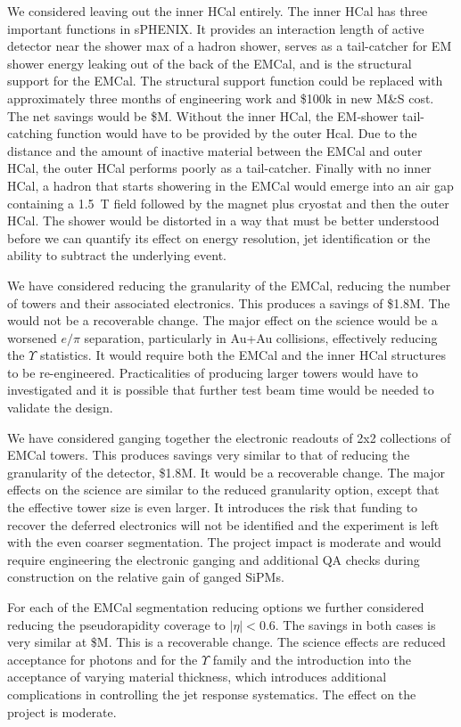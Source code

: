 We considered leaving out the inner HCal entirely.  The inner HCal has
three important functions in sPHENIX.  It provides an interaction
length of active detector near the shower max of a hadron shower,
serves as a tail-catcher for EM shower energy leaking out of the back
of the EMCal, and is the structural support for the EMCal.  The
structural support function could be replaced with approximately three
months of engineering work and \$100k in new M\&S cost.  The net
savings would be \${\noInnerHCal}M.  Without the inner HCal, the
EM-shower tail-catching function would have to be provided by the
outer Hcal.  Due to the distance and the amount of inactive material
between the EMCal and outer HCal, the outer HCal performs poorly as a
tail-catcher.  Finally with no inner HCal, a hadron that starts
showering in the EMCal would emerge into an air gap containing a 1.5~T
field followed by the magnet plus cryostat and then the outer HCal.
The shower would be distorted in a way that must be better understood
before we can quantify its effect on energy resolution, jet
identification or the ability to subtract the underlying event.

We have considered reducing the granularity of the EMCal, reducing the
number of towers and their associated electronics.  This produces a
savings of \$1.8M.  The would not be a recoverable change.  The major
effect on the science would be a worsened $e/\pi$ separation,
particularly in Au+Au collisions, effectively reducing the $\Upsilon$
statistics.  It would require both the EMCal and the inner HCal
structures to be re-engineered.  Practicalities of producing larger
towers would have to investigated and it is possible that further test
beam time would be needed to validate the design.

We have considered ganging together the electronic readouts of 2x2
collections of EMCal towers. This produces savings very similar to
that of reducing the granularity of the detector, \$1.8M.  It would be
a recoverable change.  The major effects on the science are similar to
the reduced granularity option, except that the effective tower size
is even larger.  It introduces the risk that funding to recover the
deferred electronics will not be identified and the experiment is left
with the even coarser segmentation.  The project impact is moderate
and would require engineering the electronic ganging and additional QA
checks during construction on the relative gain of ganged SiPMs.

For each of the EMCal segmentation reducing options we further
considered reducing the pseudorapidity coverage to $|\eta| < 0.6$.
The savings in both cases is very similar at \${\reducedEMCaleta}M.
This is a recoverable change.  The science effects are reduced
acceptance for photons and for the $\Upsilon$ family and the
introduction into the acceptance of varying material thickness, which
introduces additional complications in controlling the jet response
systematics. The effect on the project is moderate.

